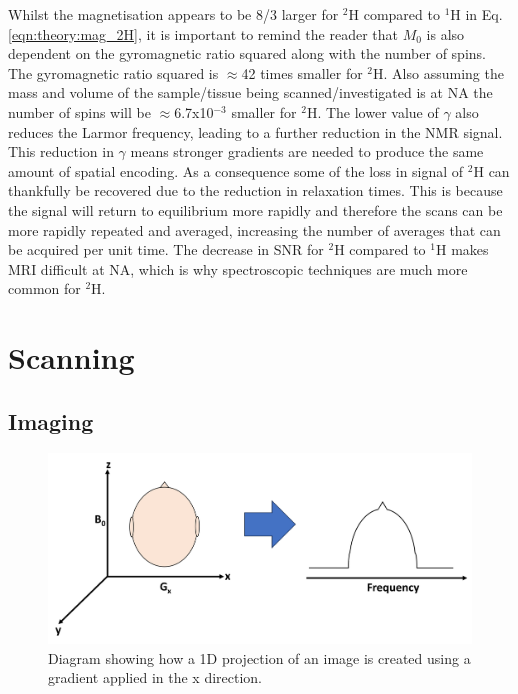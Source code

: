 Whilst the magnetisation appears to be 8/3 larger for $^2$H compared to $^1$H in Eq. \ref{eqn:theory:mag_2H}, it is important to remind the reader that $M_0$ is also dependent on the gyromagnetic ratio squared along with the number of spins. The gyromagnetic ratio squared is $\approx$42 times smaller for $^2$H. Also assuming the mass and volume of the sample/tissue being scanned/investigated is at \ac{NA} the number of spins will be $\approx$6.7x10$^{-3}$ smaller for $^2$H. The lower value of $\gamma$ also reduces the Larmor frequency, leading to a further reduction in the NMR signal. This reduction in $\gamma$ means stronger gradients are needed to produce the same amount of spatial encoding. As a consequence some of the loss in signal of $^2$H can thankfully be recovered due to the reduction in relaxation times. This is because the signal will return to equilibrium more rapidly and therefore the scans can be more rapidly repeated and averaged, increasing the number of averages that can be acquired per unit time. The decrease in \ac{SNR} for $^2$H compared to $^1$H makes \ac{MRI} difficult at \ac{NA}, which is why spectroscopic techniques are much more common for $^2$H. 


\section{Scanning}   

\subsection{Imaging}

\begin{figure}[h]
    \centering
    \includegraphics[width=1\textwidth]{Figures/Theory/1D_Projection.png}
    \caption{Diagram showing how a 1D projection of an image is created using a gradient applied in the x direction.}
    \label{fig:theory:1D}
\end{figure}

